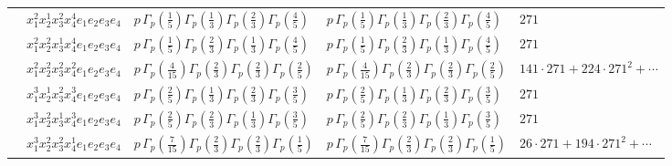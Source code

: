 \documentclass[11pt]{article}
\begin{document}
\begin{table}[ht]
{\begin{tabular}{@{}lllll@{}}
 & $x_{1}^{2} x_{2}^{1} x_{3}^{2} x_{4}^{4}  e_{1} e_{2} e_{3} e_{4}$ & $p \, \Gamma_p \left( \frac{1}{5} \right) \Gamma_p \left( \frac{1}{3} \right) \Gamma_p \left( \frac{2}{3} \right) \Gamma_p \left( \frac{4}{5} \right)$ & $p \, \Gamma_p \left( \frac{1}{5} \right) \Gamma_p \left( \frac{1}{3} \right) \Gamma_p \left( \frac{2}{3} \right) \Gamma_p \left( \frac{4}{5} \right)$ & $271$ \\
 & $x_{1}^{2} x_{2}^{2} x_{3}^{1} x_{4}^{4}  e_{1} e_{2} e_{3} e_{4}$ & $p \, \Gamma_p \left( \frac{1}{5} \right) \Gamma_p \left( \frac{2}{3} \right) \Gamma_p \left( \frac{1}{3} \right) \Gamma_p \left( \frac{4}{5} \right)$ & $p \, \Gamma_p \left( \frac{1}{5} \right) \Gamma_p \left( \frac{2}{3} \right) \Gamma_p \left( \frac{1}{3} \right) \Gamma_p \left( \frac{4}{5} \right)$ & $271$ \\
 & $x_{1}^{2} x_{2}^{2} x_{3}^{2} x_{4}^{2}  e_{1} e_{2} e_{3} e_{4}$ & $p \, \Gamma_p \left( \frac{4}{15} \right) \Gamma_p \left( \frac{2}{3} \right) \Gamma_p \left( \frac{2}{3} \right) \Gamma_p \left( \frac{2}{5} \right)$ & $p \, \Gamma_p \left( \frac{4}{15} \right) \Gamma_p \left( \frac{2}{3} \right) \Gamma_p \left( \frac{2}{3} \right) \Gamma_p \left( \frac{2}{5} \right)$ & $141{\cdot}271{+}224{\cdot}271^{2}{+}\cdots$ \\
 & $x_{1}^{3} x_{2}^{1} x_{3}^{2} x_{4}^{3}  e_{1} e_{2} e_{3} e_{4}$ & $p \, \Gamma_p \left( \frac{2}{5} \right) \Gamma_p \left( \frac{1}{3} \right) \Gamma_p \left( \frac{2}{3} \right) \Gamma_p \left( \frac{3}{5} \right)$ & $p \, \Gamma_p \left( \frac{2}{5} \right) \Gamma_p \left( \frac{1}{3} \right) \Gamma_p \left( \frac{2}{3} \right) \Gamma_p \left( \frac{3}{5} \right)$ & $271$ \\
 & $x_{1}^{3} x_{2}^{2} x_{3}^{1} x_{4}^{3}  e_{1} e_{2} e_{3} e_{4}$ & $p \, \Gamma_p \left( \frac{2}{5} \right) \Gamma_p \left( \frac{2}{3} \right) \Gamma_p \left( \frac{1}{3} \right) \Gamma_p \left( \frac{3}{5} \right)$ & $p \, \Gamma_p \left( \frac{2}{5} \right) \Gamma_p \left( \frac{2}{3} \right) \Gamma_p \left( \frac{1}{3} \right) \Gamma_p \left( \frac{3}{5} \right)$ & $271$ \\
 & $x_{1}^{3} x_{2}^{2} x_{3}^{2} x_{4}^{1}  e_{1} e_{2} e_{3} e_{4}$ & $p \, \Gamma_p \left( \frac{7}{15} \right) \Gamma_p \left( \frac{2}{3} \right) \Gamma_p \left( \frac{2}{3} \right) \Gamma_p \left( \frac{1}{5} \right)$ & $p \, \Gamma_p \left( \frac{7}{15} \right) \Gamma_p \left( \frac{2}{3} \right) \Gamma_p \left( \frac{2}{3} \right) \Gamma_p \left( \frac{1}{5} \right)$ & $26{\cdot}271{+}194{\cdot}271^{2}{+}\cdots$ \\

\end{tabular}}
\end{table}
\end{document}
